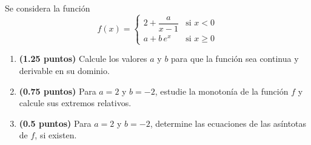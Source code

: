 
Se considera la función
\[
f(x)=\begin{cases}
2+\dfrac{a}{x-1} & \text{si }x<0\\
a+b\,e^x & \text{si }x\geq 0
\end{cases}
\]
\begin{enumerate}[label=\alph*)]
  \item \textbf{(1.25 puntos)} Calcule los valores $a$ y $b$ para que la función
  sea continua y derivable en su dominio.
  \item \textbf{(0.75 puntos)} Para $a=2$ y $b=-2$, estudie la monotonía de la
  función $f$ y calcule sus extremos relativos.
  \item \textbf{(0.5 puntos)} Para $a=2$ y $b=-2$, determine las ecuaciones de
  las asíntotas de $f$, si existen.
\end{enumerate}
